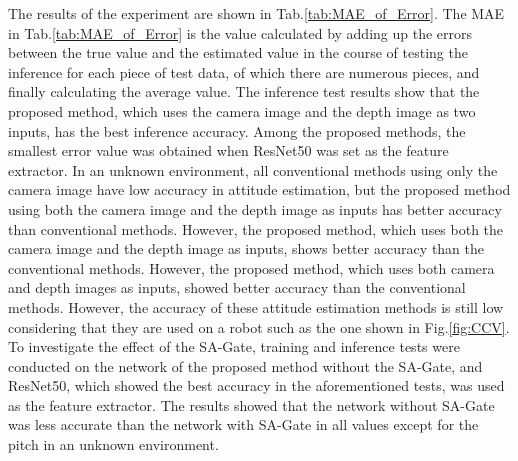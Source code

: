 The results of the experiment are shown in Tab.\ref{tab:MAE_of_Error}. The MAE in Tab.\ref{tab:MAE_of_Error} is the value calculated by adding up the errors between the true value and the estimated value in the course of testing the inference for each piece of test data, of which there are numerous pieces, and finally calculating the average value. The inference test results show that the proposed method, which uses the camera image and the depth image as two inputs, has the best inference accuracy. Among the proposed methods, the smallest error value was obtained when ResNet50 was set as the feature extractor. In an unknown environment, all conventional methods using only the camera image have low accuracy in attitude estimation, but the proposed method using both the camera image and the depth image as inputs has better accuracy than conventional methods. However, the proposed method, which uses both the camera image and the depth image as inputs, shows better accuracy than the conventional methods. However, the proposed method, which uses both camera and depth images as inputs, showed better accuracy than the conventional methods. However, the accuracy of these attitude estimation methods is still low considering that they are used on a robot such as the one shown in Fig.\ref{fig:CCV}. To investigate the effect of the SA-Gate, training and inference tests were conducted on the network of the proposed method without the SA-Gate, and ResNet50, which showed the best accuracy in the aforementioned tests, was used as the feature extractor. The results showed that the network without SA-Gate was less accurate than the network with SA-Gate in all values except for the pitch in an unknown environment.



